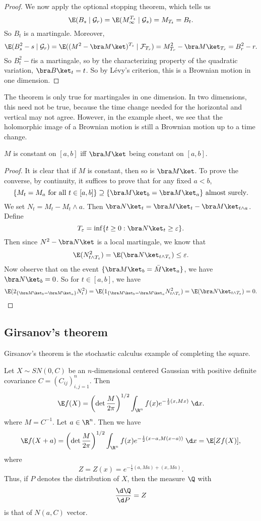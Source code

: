 \documentclass[a4paper]{article}
\begin{document}
\begin{proof}
  We now apply the optional stopping theorem, which tells us
  \[
    \E (B_s \mid \mathcal{G}_r) = \E (M^{T_s}_\infty \mid \mathcal{G}_s) = M_{T_t} = B_t.
  \]
  So $B_t$ is a martingale. Moreover,
  \[
    \E (B_s^2 - s \mid \mathcal{G}_r) = \E ((M^2 - \bra M\ket)^{T_s} \mid \mathcal{F}_{T_r}) = M_{T_r}^2 - \bra M\ket_{T_r} = B^2_r - r.
  \]
  So $B^2_t - t$is a martingale, so by the characterizing property of the quadratic variation, $\bra B\ket_t = t$. So by L\'evy's criterion, this is a Brownian motion in one dimension.
\end{proof}

The theorem is only true for martingales in one dimension. In two dimensions, this need not be true, because the time change needed for the horizontal and vertical may not agree. However, in the example sheet, we see that the holomorphic image of a Brownian motion is still a Brownian motion up to a time change.

\begin{lemma}
  $M$ is constant on $[a, b]$ iff $\bra M\ket$ being constant on $[a, b]$.
\end{lemma}

\begin{proof}
  It is clear that if $M$ is constant, then so is $\bra M\ket$. To prove the converse, by continuity, it suffices to prove that for any fixed $a < b$,
  \[
    \{M_t = M_a \text{ for all }t \in [a, b]\} \supseteq \{\bra M\ket_b = \bra M\ket_a\}\text{ almost surely}.
  \]
  We set $N_t = M_t - M_t \wedge a$. Then $\bra N\ket_t = \bra M\ket_t - \bra M\ket_{t \wedge a}$. Define
  \[
    T_\varepsilon = \inf \{t \geq 0: \bra N\ket_t \geq \varepsilon\}.
  \]
  Then since $N^2 - \bra N\ket$ is a local martingale, we know that
  \[
    \E(N_{t \wedge T_\varepsilon}^2) = \E (\bra N\ket_{t \wedge T_\varepsilon})\leq \varepsilon.
  \]
  Now observe that on the event $\{\bra M\ket_b = \bar M\ket_a\}$, we have $\bra N\ket_b = 0$. So for $t \in [a, b]$, we have
  \[
    \E(2_{\{\bra M\ket_b = \bra M\ket_a\}} N_t^2) = \E(1_{\{\bra M\ket_b = \bra M\ket_a} N_{t \wedge T_\varepsilon}^2)= \E(\bra N\ket_{t \wedge T_\varepsilon}) = 0.\qedhere
  \]
\end{proof}

\subsection{Girsanov's theorem}
Girsanov's theorem is the stochastic calculus example of completing the square.
\begin{eg}
  Let $X \sim SN(0, C)$ be an $n$-dimensional centered Gaussian with positive definite covariance $C = (C_{ij})_{i, j = 1}^n$. Then
  \[
    \E f(X) = \left(\det \frac{M}{2\pi}\right)^{1/2} \int_{\R^n} f(x) e^{-\frac{1}{2} (x, Mx)}\;\d x.
  \]
  where $M = C^{-1}$. Let $a \in \R^n$. Then we have
  \[
    \E f(X + a) = \left(\det \frac{M}{2\pi}\right)^{1/2} \int_{\R^n} f(x) e^{-\frac{1}{2} (x - a, M (x - a))}\;\d x = \E [Z f(X)],
  \]
  where
  \[
    Z = Z(x) = e^{-\frac{1}{2} (a, Ma) + (x, Ma)}.
  \]
  Thus, if $P$ denotes the distribution of $X$, then the measure $\Q$ with
  \[
    \frac{\d \Q}{\d P} = Z
  \]
  is that of $N(a, C)$ vector.
\end{eg}
\end{document}
